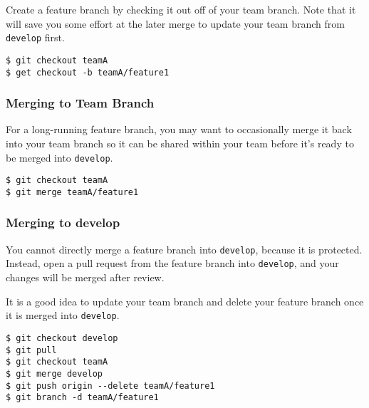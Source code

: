 Create a feature branch by checking it out off of your team branch. Note
that it will save you some effort at the later merge to update your team
branch from \texttt{develop} first.

\begin{verbatim}
$ git checkout teamA
$ get checkout -b teamA/feature1
\end{verbatim}

\subsubsection{Merging to Team Branch}\label{merging-to-team-branch}

For a long-running feature branch, you may want to occasionally merge it
back into your team branch so it can be shared within your team before
it's ready to be merged into \texttt{develop}.

\begin{verbatim}
$ git checkout teamA
$ git merge teamA/feature1
\end{verbatim}

\subsubsection{Merging to develop}\label{merging-to-develop}

You cannot directly merge a feature branch into \texttt{develop},
because it is protected. Instead, open a pull request from the feature
branch into \texttt{develop}, and your changes will be merged after
review.

It is a good idea to update your team branch and delete your feature
branch once it is merged into \texttt{develop}.

\begin{verbatim}
$ git checkout develop
$ git pull
$ git checkout teamA
$ git merge develop
$ git push origin --delete teamA/feature1
$ git branch -d teamA/feature1
\end{verbatim}
